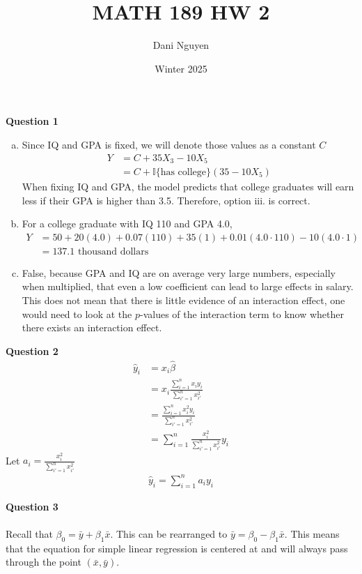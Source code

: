 \documentclass[12pt, letterpaper]{article}
\title{MATH 189 HW 2}
\author{Dani Nguyen}
\date{Winter 2025}
\begin{document}
\maketitle
\graphicspath{ {./} }

\noindent \textbf{Question 1}
\begin{enumerate}[a.]
    \item Since IQ and GPA is fixed, we will denote those values as a constant $C$
    \begin{align*}
        Y &= C + 35X_3 - 10X_5 \\
        &= C + \mathbb{I}\{\text{has college}\} (35-10X_5)
    \end{align*}
    When fixing IQ and GPA, the model predicts that college graduates will earn less 
    if their GPA is higher than 3.5. Therefore, option iii. is correct.
    \item For a college graduate with IQ 110 and GPA 4.0,
    \begin{align*}
        Y &= 50 + 20(4.0) + 0.07(110) + 35(1) + 0.01(4.0 \cdot 110) - 10(4.0\cdot1) \\
        &= 137.1 \text{ thousand dollars}
    \end{align*}
    \item False, because GPA and IQ are on average very large numbers, especially 
        when multiplied, that even a low coefficient can lead to large effects in
        salary. This does not mean that there is little evidence of an interaction 
        effect, one would need to look at the $p$-values of the interaction term to 
        know whether there exists an interaction effect. 
\end{enumerate}
\newpage
\noindent \textbf{Question 2} \\
\begin{align*}
    \hat y_i &= x_i \hat \beta \\
    &= x_i \frac{\sum_{i=1}^{n}x_iy_i}{\sum_{i'=1}^{n}x_{i'}^2} \\
    &= \frac{\sum_{i=1}^{n}x_i^2 y_i}{\sum_{i'=1}^{n}x_{i'}^2} \\
    &= \sum_{i=1}^{n} \frac{x_i^2}{\sum_{i'=1}^{n}x_{i'}^2} y_i
\end{align*}
Let $a_i = \frac{x_i^2}{\sum_{i'=1}^{n}x_{i'}^2}$
\begin{align*}
    \hat y_i = \sum_{i=1}^{n}a_iy_i
\end{align*}

\noindent \textbf{Question 3} \\ \\
Recall that $\beta_0 = \bar y + \beta_1 \bar x$. This can be rearranged to 
$\bar y = \beta_0 - \beta_1\bar x$. This means that the equation for simple linear 
regression is centered at and will always pass through the point $(\bar x, \bar y)$. \\
\end{document}
